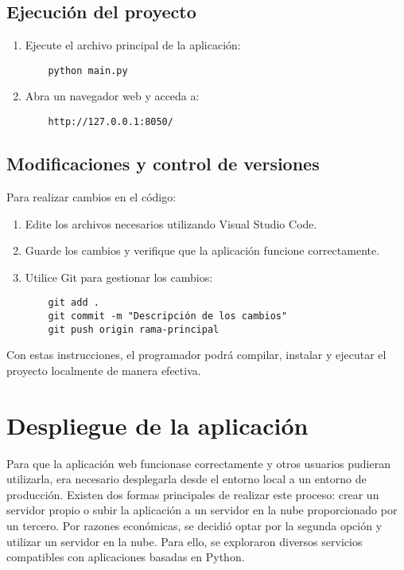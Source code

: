 \subsection{Ejecución del proyecto}
\begin{enumerate}
    \item Ejecute el archivo principal de la aplicación:
    \begin{verbatim}
    python main.py
    \end{verbatim}
    \item Abra un navegador web y acceda a:
    \begin{verbatim}
    http://127.0.0.1:8050/
    \end{verbatim}
\end{enumerate}

\subsection{Modificaciones y control de versiones}
Para realizar cambios en el código:
\begin{enumerate}
    \item Edite los archivos necesarios utilizando Visual Studio Code.
    \item Guarde los cambios y verifique que la aplicación funcione correctamente.
    \item Utilice Git para gestionar los cambios:
    \begin{verbatim}
    git add .
    git commit -m "Descripción de los cambios"
    git push origin rama-principal
    \end{verbatim}
\end{enumerate}

Con estas instrucciones, el programador podrá compilar, instalar y ejecutar el proyecto localmente de manera efectiva.

\section{Despliegue de la aplicación}

Para que la aplicación web funcionase correctamente y otros usuarios pudieran utilizarla, era necesario desplegarla desde el entorno local a un entorno de producción. Existen dos formas principales de realizar este proceso: crear un servidor propio o subir la aplicación a un servidor en la nube proporcionado por un tercero. Por razones económicas, se decidió optar por la segunda opción y utilizar un servidor en la nube. Para ello, se exploraron diversos servicios compatibles con aplicaciones basadas en Python.


